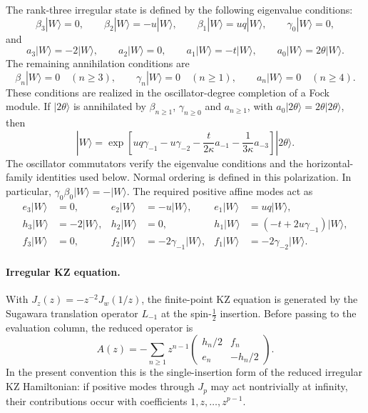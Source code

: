 \documentclass[a4paper,11pt]{article}
\numberwithin{equation}{section}
\begin{document}
The rank-three irregular state is defined by the following eigenvalue conditions:
\begin{equation}
	\beta_{3}|W\rangle=0,
	\qquad
	\beta_{2}|W\rangle=-u|W\rangle,
	\qquad
	\beta_{1}|W\rangle=uq|W\rangle,
	\qquad
	\gamma_{0}|W\rangle=0,
\end{equation}
and
\begin{equation}
	a_{3}|W\rangle=-2|W\rangle,
	\qquad
	a_{2}|W\rangle=0,
	\qquad
	a_{1}|W\rangle=-t|W\rangle,
	\qquad
	a_{0}|W\rangle=2\theta|W\rangle.
\end{equation}
The remaining annihilation conditions are
\begin{equation}
 \beta_{n}|W\rangle=0\quad(n\geq3),\qquad
 \gamma_{n}|W\rangle=0\quad(n\geq1),\qquad
 a_{n}|W\rangle=0\quad(n\geq4).
\end{equation}
These conditions are realized in the oscillator-degree completion
of a Fock module.  If $|2\theta\rangle$ is annihilated by
$\beta_{n\geq1}$, $\gamma_{n\geq0}$ and $a_{n\geq1}$, with
$a_{0}|2\theta\rangle=2\theta|2\theta\rangle$, then
\begin{equation}
 |W\rangle
 =\exp\left[
 uq\gamma_{-1}-u\gamma_{-2}
 -\frac{t}{2\kappa}a_{-1}-\frac{1}{3\kappa}a_{-3}
 \right]|2\theta\rangle.
\end{equation}
The oscillator commutators verify the eigenvalue conditions and
the horizontal-family identities used below.  Normal ordering is
defined in this polarization.  In particular,
$\gamma_{0}\beta_{0}|W\rangle=-|W\rangle$.
The required positive affine modes act as
\begin{align}
	e_{3}|W\rangle&=0,
	&
	e_{2}|W\rangle&=-u|W\rangle,
	&
	e_{1}|W\rangle&=uq|W\rangle,
	\\
	h_{3}|W\rangle&=-2|W\rangle,
	&
	h_{2}|W\rangle&=0,
	&
	h_{1}|W\rangle&=\left(-t+2u\gamma_{-1}\right)|W\rangle,
	\\
	f_{3}|W\rangle&=0,
	&
	f_{2}|W\rangle&=-2\gamma_{-1}|W\rangle,
	&
	f_{1}|W\rangle&=-2\gamma_{-2}|W\rangle.
\end{align}

\paragraph*{Irregular KZ equation.}

With $J_{z}(z)=-z^{-2}J_{w}(1/z)$, the finite-point KZ equation is generated by the Sugawara translation
operator $L_{-1}$ at the spin-$\frac{1}{2}$ insertion.  Before passing
to the evaluation column, the reduced operator is
\begin{equation}
	A(z)
	=
	-\sum_{n\geq 1}z^{n-1}
	\begin{pmatrix}
		h_{n}/2&f_{n}\\
		e_{n}&-h_{n}/2
	\end{pmatrix}.
\end{equation}
In the present convention this is the single-insertion form of the reduced irregular KZ Hamiltonian: if positive modes through $J_{p}$ may act nontrivially at infinity, their contributions occur with coefficients $1,z,\ldots,z^{p-1}$.
\end{document}

